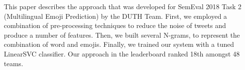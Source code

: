 This paper describes the approach that was developed for SemEval 2018 Task 2 (Multilingual Emoji Prediction) by the DUTH Team. First, we employed a combination of pre-processing techniques to reduce the noise of tweets and produce a number of features. Then, we built several N-grams, to represent the combination of word and emojis. Finally, we trained our system with a tuned LinearSVC classifier. Our approach in the leaderboard ranked 18th amongst 48 teams.
